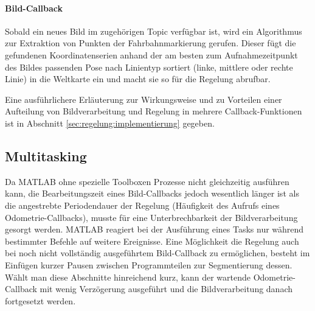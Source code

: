 \paragraph{Bild-Callback}
Sobald ein neues Bild im zugehörigen Topic verfügbar ist, wird ein Algorithmus zur Extraktion von Punkten der Fahrbahnmarkierung gerufen. Dieser fügt die gefundenen Koordinatenserien anhand der am besten zum Aufnahmezeitpunkt des Bildes passenden Pose nach Linientyp sortiert (\glqq linke\grqq , \glqq mittlere\grqq{} oder \glqq rechte\grqq{} Linie) in die Weltkarte ein und macht sie so für die Regelung abrufbar.

Eine ausführlichere Erläuterung zur Wirkungsweise und zu Vorteilen einer Aufteilung von Bildverarbeitung und Regelung in mehrere Callback-Funktionen ist in Abschnitt \ref{sec:regelung:implementierung} gegeben.
\subsection{Multitasking}
Da MATLAB ohne spezielle Toolboxen Prozesse nicht gleichzeitig ausführen kann, die Bearbeitungszeit eines Bild-Callbacks jedoch wesentlich länger ist als die angestrebte Periodendauer der Regelung (Häufigkeit des Aufrufs eines Odometrie-Callbacks), musste für eine Unterbrechbarkeit der Bildverarbeitung gesorgt werden. MATLAB reagiert bei der Ausführung eines Tasks nur während bestimmter Befehle auf weitere Ereignisse. Eine Möglichkeit die Regelung auch bei noch nicht vollständig ausgeführtem Bild-Callback zu ermöglichen, besteht im Einfügen kurzer Pausen zwischen Programmteilen zur Segmentierung dessen. Wählt man diese Abschnitte hinreichend kurz, kann der wartende Odometrie-Callback mit wenig Verzögerung ausgeführt und die Bildverarbeitung danach fortgesetzt werden.


